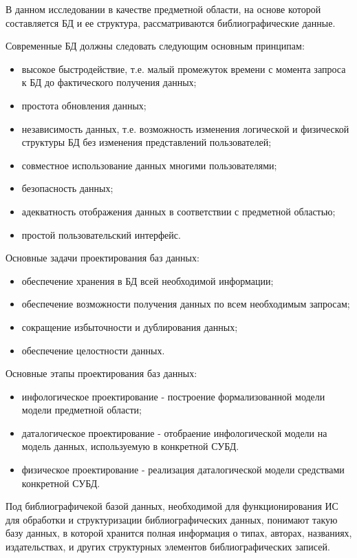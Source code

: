 В данном исследовании в качестве предметной области, на основе которой составляется БД и ее структура, рассматриваются библиографические данные.

Современные БД должны следовать следующим основным принципам:
\begin{itemize}
	\item высокое быстродействие, т.е. малый промежуток времени с момента запроса к БД до фактического получения данных;
	\item простота обновления данных;
	\item независимость данных, т.е. возможность изменения логической и физической структуры БД без изменения представлений пользователей;
	\item совместное использование данных многими пользователями;
	\item безопасность данных;
	\item адекватность отображения данных в соответствии с предметной областью;
	\item простой пользовательский интерфейс.
\end{itemize}

Основные задачи проектирования баз данных:
\begin{itemize}
	\item обеспечение хранения в БД всей необходимой информации;
	\item обеспечение возможности получения данных по всем необходимым запросам;
	\item сокращение избыточности и дублирования данных;
	\item обеспечение целостности данных.
\end{itemize}

Основные этапы проектирования баз данных:
\begin{itemize}
	\item инфологическое проектирование - построение формализованной модели модели предметной области;
	\item даталогическое проектирование - отобраение инфологической модели на модель данных, используемую в конкретной СУБД.
	\item физическое проектирование - реализация даталогической модели средствами конкретной СУБД.
\end{itemize}

Под библиографичекой базой данных, необходимой для функционирования ИС для обработки и структуризации библиографических данных, понимают такую базу данных, в которой хранится полная информация о типах, авторах, названиях, издательствах, и других структурных элементов библиографических записей.

